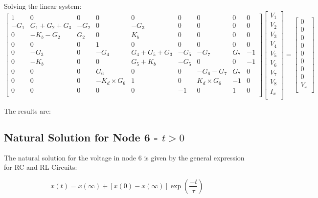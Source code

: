 Solving the linear system:
$$
\begin{bmatrix}
1  &  0 & 0 & 0 & 0 & 0 & 0 & 0 &0      \\
-G_1 & G_1+G_2+G_3 & -G_2 & 0 & -G_3 & 0 & 0 & 0   &0   \\
0 & -K_b-G_2 & G_2 & 0 & K_b & 0 & 0 & 0&0\\
0 & 0 & 0  & 1 & 0 & 0 & 0 & 0  &0    \\
0 & -G_3 & 0 & -G_4 & G_4+G_5+G_3 & -G_5 & -G_7 & G_7 & -1\\
0 & -K_b & 0 & 0 & G_5+K_b & -G_5 & 0 & 0 & -1\\
0 & 0& 0 & G_6 & 0 & 0 & -G_6-G_7 & G_7& 0\\
0 & 0 & 0 & -K_d\times G_6 & 1 & 0 & K_d\times G_6 & -1& 0\\
0 & 0 & 0 & 0 & 0 & -1 & 0 & 1 & 0\\
\end{bmatrix}
\begin{bmatrix}
V_1     \\
V_2    \\
V_3   \\
V_4     \\
V_5     \\
V_6     \\
V_7     \\
V_8     \\
I_x     \\
\end{bmatrix}
=
\begin{bmatrix}
0   \\
0    \\
0  \\
0  \\
0  \\
0  \\
0  \\
0  \\
V_x \\
\end{bmatrix}
\quad
$$

The results are:


\subsection{Natural Solution for Node 6 - $t>0$}

The natural solution for the voltage in node 6 is given by the general expression for RC and RL Circuits:

\begin{equation}
    x(t)=x(\infty) + [x(0)-x(\infty)]\exp(\frac{-t}{\tau})
\end{equation}

